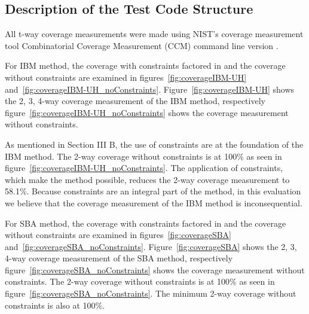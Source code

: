 \documentclass[conference]{IEEEtran}
\begin{document}

\subsection{Description of the Test Code Structure}
	
All t-way coverage measurements were made using NIST's coverage measurement tool Combinatorial Coverage Measurement (CCM) command line version \cite{kuhn2013combinatorial}.

	For IBM method, the coverage with constraints factored in and the coverage without constraints are examined in figures~\ref{fig:coverageIBM-UH} and~\ref{fig:coverageIBM-UH_noConstraints}.
Figure~\ref{fig:coverageIBM-UH} shows the 2, 3, 4-way coverage measurement of the IBM method, respectively figure~\ref{fig:coverageIBM-UH_noConstraints} shows the coverage measurement without constraints. 

%	

As mentioned in Section III B, the use of constraints are at the foundation of the IBM method. 
The 2-way coverage without constraints is at 100\% as seen in figure~\ref{fig:coverageIBM-UH_noConstraints}.
The application of constraints, which make the method possible, reduces the 2-way coverage measurement to 58.1\%. Because constraints are an integral part of the method, in this evaluation we believe that the coverage measurement of the IBM method is inconsequential. 

For SBA method, the coverage with constraints factored in and the coverage without constraints are examined in figures~\ref{fig:coverageSBA} and~\ref{fig:coverageSBA_noConstraints}.
Figure~\ref{fig:coverageSBA} shows the 2, 3, 4-way coverage measurement of the SBA method, respectively figure~\ref{fig:coverageSBA_noConstraints} shows the coverage measurement without constraints.
The 2-way coverage without constraints is at 100\% as seen in figure~\ref{fig:coverageSBA_noConstraints}. The minimum 2-way coverage without constraints is also at 100\%. 
\end{document}
